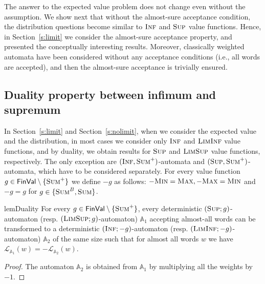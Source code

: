 \documentclass{lmcs}
\newcommand{\nestedA}{\mathbb{A}}
\newcommand{\valueL}[1]{\mathcal{L}_{{#1}}}
\newcommand{\fsum}{\textsc{Sum}}
\newcommand{\fBsum}[1]{\textsc{Sum}^{#1}}
\newcommand{\fmax}{\textsc{Max}}
\newcommand{\fmin}{\textsc{Min}}
\newcommand{\fliminf}{\textsc{LimInf}}
\newcommand{\flimsup}{\textsc{LimSup}}
\newcommand{\fsup}{\textsc{Sup}}
\newcommand{\finf}{\textsc{Inf}}
\newcommand{\FinVal}{\mathsf{FinVal}}
\begin{document}
\begin{rem}\label{rem:almost-sure}
The answer to the expected value problem does not change even without
the assumption.
We show next that without the almost-sure acceptance condition,
the distribution questions become similar to $\finf$ and $\fsup$ value functions.
Hence, in Section~\ref{s:limit} we consider the almost-sure acceptance property,
and presented the conceptually interesting results.
Moreover, classically weighted automata have been considered without any
acceptance conditions (i.e., all words are accepted), and then
the almost-sure acceptance is trivially ensured.
\end{rem}



\subsection{Duality property between infimum and supremum}
In Section~\ref{s:limit} and Section~\ref{s:nolimit}, when we consider the expected value and the distribution,
in most cases we consider only $\finf$ and $\fliminf$ value functions,
and by duality, we obtain results
for $\fsup$ and $\flimsup$ value functions, respectively.
The only exception are $(\finf, \fsum^+)$-automata and $(\fsup, \fsum^+)$-automata,
which have to be considered separately.
For every value function $g \in \FinVal \setminus \{\fsum^+\}$ we define $-g$ as  follows:
$-{\fmin} = \fmax, -{\fmax} = \fmin$ and
$-{g} = g$ for $g \in \{\fBsum{B}, \fsum\}$.

\begin{restatable}{lem}{Duality}\label{l:sup-to-inf}
For every $g \in \FinVal \setminus \{\fsum^+\}$, every deterministic $(\fsup; g)$-automaton (resp. $(\flimsup; g)$-automaton) $\nestedA_1$
accepting almost-all words can be transformed to a deterministic $(\finf; -{g})$-automaton (resp. $(\fliminf; -{g})$-automaton) $\nestedA_2$ of the same size such that for almost all words $w$ we have
$\valueL{\nestedA_1}(w) = -\valueL{\nestedA_2}(w)$.
\end{restatable}
\begin{proof}
The automaton $\nestedA_2$ is obtained from $\nestedA_1$ by multiplying all the weights by $-1$.
\end{proof}
\end{document}
